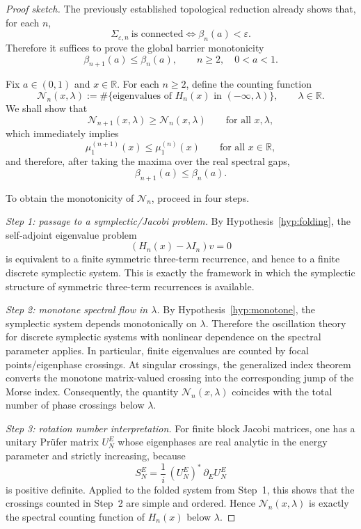 \documentclass[11pt]{article}
\numberwithin{equation}{section}
\begin{document}
\begin{proof}[Proof sketch]
The previously established topological reduction already shows that, for each \(n\),
\[
\Sigma_{\varepsilon,n}\ \text{is connected}
\iff
\beta_n(a)<\varepsilon.
\]
Therefore it suffices to prove the global barrier monotonicity
\[
\beta_{n+1}(a)\le \beta_n(a),
\qquad n\ge2,\quad 0<a<1.
\]

Fix \(a\in(0,1)\) and \(x\in\mathbb R\). For each \(n\ge2\), define the counting function
\[
\mathcal N_n(x,\lambda)
:=
\#\bigl\{\text{eigenvalues of }H_n(x)\text{ in }(-\infty,\lambda)\bigr\},
\qquad \lambda\in\mathbb R.
\]
We shall show that
\[
\mathcal N_{n+1}(x,\lambda)\ge \mathcal N_n(x,\lambda)
\qquad\text{for all }x,\lambda,
\]
which immediately implies
\[
\mu_1^{(n+1)}(x)\le \mu_1^{(n)}(x)
\qquad\text{for all }x\in\mathbb R,
\]
and therefore, after taking the maxima over the real spectral gaps,
\[
\beta_{n+1}(a)\le \beta_n(a).
\]

To obtain the monotonicity of \(\mathcal N_n\), proceed in four steps.

\medskip
\noindent
\textit{Step 1: passage to a symplectic/Jacobi problem.}
By Hypothesis~\ref{hyp:folding}, the self-adjoint eigenvalue problem
\[
(H_n(x)-\lambda I_n)v=0
\]
is equivalent to a finite symmetric three-term recurrence, and hence to a finite discrete
symplectic system. This is exactly the framework in which the symplectic structure of symmetric
three-term recurrences is available.

\medskip
\noindent
\textit{Step 2: monotone spectral flow in \(\lambda\).}
By Hypothesis~\ref{hyp:monotone}, the symplectic system depends monotonically on
\(\lambda\). Therefore the oscillation theory for discrete symplectic systems with nonlinear
dependence on the spectral parameter applies. In particular, finite eigenvalues
are counted by focal points/eigenphase crossings. At singular crossings, the generalized index
theorem converts the monotone matrix-valued crossing into the corresponding
jump of the Morse index. Consequently, the quantity \(\mathcal N_n(x,\lambda)\)
coincides with the total number of phase crossings below \(\lambda\).

\medskip
\noindent
\textit{Step 3: rotation number interpretation.}
For finite block Jacobi matrices, one has a unitary Prüfer matrix
\(U_N^E\) whose eigenphases are real analytic in the energy parameter and strictly increasing,
because
\[
S_N^E=\frac{1}{i}\,(U_N^E)^*\,\partial_E U_N^E
\]
is positive definite. Applied to the folded system from Step~1, this
shows that the crossings counted in Step~2 are simple and ordered. Hence \(\mathcal N_n(x,\lambda)\)
is exactly the spectral counting function of \(H_n(x)\) below \(\lambda\).


\end{proof}
\end{document}
